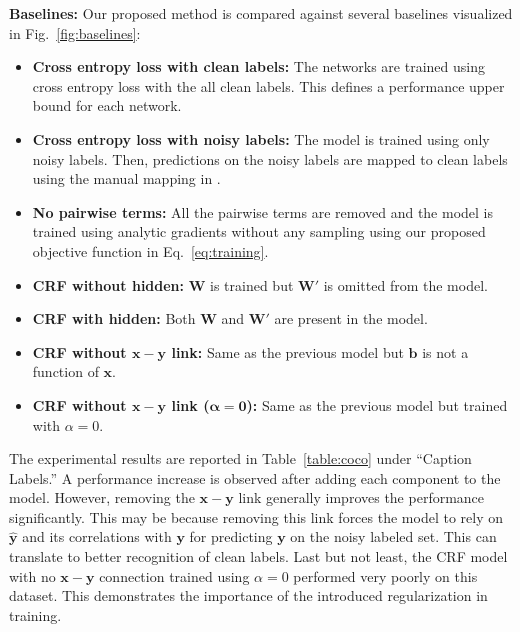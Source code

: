 \documentclass{article}
\newcommand{\x}{{\pmb{x}}}
\newcommand{\y}{{\pmb{y}}}
\newcommand{\yh}{{\hat{\pmb{y}}}}
\renewcommand{\b}{{\pmb{b}}}
\newcommand{\W}{{\pmb{W}}}
\begin{document}
\textbf{Baselines:} Our proposed method is compared against several baselines visualized in Fig.~\ref{fig:baselines}:
\begin{itemize}
\item \textbf{Cross entropy loss with clean labels:} The networks are trained using cross entropy loss with the all clean labels. This defines a performance upper bound for each network.
\item \textbf{Cross entropy loss with noisy labels:} The model is trained using only noisy labels. Then, predictions on the noisy labels are mapped to clean labels using the manual mapping in \cite{Misra2016}.
\item \textbf{No pairwise terms:} All the pairwise terms are removed and the model is trained using analytic gradients without any sampling using our proposed objective function in Eq.~\ref{eq:training}.
\item \textbf{CRF without hidden:} $\W$ is trained but $\W'$ is omitted from the model.
\item \textbf{CRF with hidden:} Both $\W$ and $\W'$ are present in the model.
\item \textbf{CRF without $\x-\y$ link:} Same as the previous model but $\b$ is not a function of $\x$.
\item \textbf{CRF without $\x-\y$ link ($\pmb{\alpha=0}$):} Same as the previous model but trained with $\alpha = 0$.
\end{itemize}

The experimental results are reported in Table~\ref{table:coco} under ``Caption Labels.'' A performance increase
is observed after adding each component to the model. However, removing the $\x-\y$ link generally improves the performance
significantly. This may be because removing this link forces the model to rely on $\yh$ and its correlations with $\y$ for predicting $\y$ on the noisy labeled set.
This can translate to better recognition of clean labels.
Last but not least, the CRF model with no $\x-\y$ connection trained using $\alpha=0$ performed very poorly on this dataset.
This demonstrates the importance of the introduced regularization in training.
\end{document}
